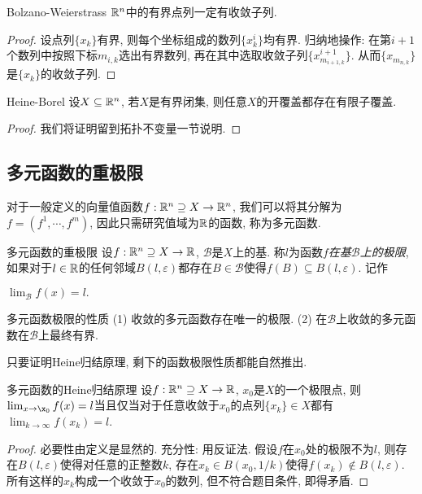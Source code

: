 \begin{theorem}{Bolzano-Weierstrass}
	$\mathbb{R} ^n$中的有界点列一定有收敛子列. 
\end{theorem}
\begin{proof}
	设点列$\{ x_k \}$有界, 则每个坐标组成的数列$\{ x^i_k \}$均有界. 归纳地操作: 在第$i+1$个数列中按照下标$m_{{i,k}}$选出有界数列, 再在其中选取收敛子列$\{ x^{i+1}_{m_{i+1,k}} \}$. 从而$\{ x_{m_{n,k}} \}$是$\{ x_k \}$的收敛子列. 
\end{proof}

\begin{theorem}{Heine-Borel}
	设$X \subseteq \mathbb{R} ^n$, 若$X$是有界闭集, 则任意$X$的开覆盖都存在有限子覆盖. 
\end{theorem}
\begin{proof}
	我们将证明留到拓扑不变量一节说明. 
\end{proof}

\subsection{多元函数的重极限}

对于一般定义的向量值函数$f:\mathbb{R} ^n \supseteq X \to \mathbb{R} ^n$, 我们可以将其分解为$f=(f^1,\cdots ,f^m)$, 因此只需研究值域为$\mathbb{R}$的函数, 称为多元函数. 

\begin{definition}{多元函数的重极限}
	设$f: \mathbb{R} ^n \supseteq X \to \mathbb{R}$, $\mathcal{B}$是$X$上的基. 称$l$为函数$f$\textit{在基$\mathcal{B}$上的极限}, 如果对于$l \in \mathbb{R}$的任何邻域$B(l,\varepsilon)$都存在$B \in \mathcal{B}$使得$f(B) \subseteq B(l,\varepsilon)$. 记作
	\begin{center}
		$\displaystyle \lim_{\mathcal{B}}f(x)=l.$
	\end{center}
\end{definition}

\begin{proposition}{多元函数极限的性质}
	(1) 收敛的多元函数存在唯一的极限. \qquad (2) 在$\mathcal{B}$上收敛的多元函数在$\mathcal{B}$上最终有界. 
\end{proposition}

只要证明Heine归结原理, 剩下的函数极限性质都能自然推出. 

\begin{theorem}{多元函数的Heine归结原理}
	设$f: \mathbb{R} ^n \supseteq X \to \mathbb{R}$, $x_0$是$X$的一个极限点, 则$\lim_{x\to \x_0}f(x)=l$当且仅当对于任意收敛于$x_0$的点列$\{ x_k \} \in X$都有$\lim_{k\to \infty} f(x_k)=l$. 
\end{theorem}
\begin{proof}
	必要性由定义是显然的. 充分性: 用反证法. 假设$f$在$x_0$处的极限不为$l$, 则存在$B(l,\varepsilon)$使得对任意的正整数$k$, 存在$x_k \in B(x_0,1/k)$使得$f(x_k) \notin B(l,\varepsilon)$. 所有这样的$x_k$构成一个收敛于$x_0$的数列, 但不符合题目条件, 即得矛盾. 
\end{proof}


